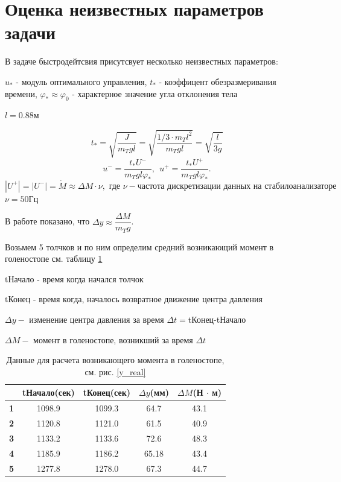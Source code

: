 \documentclass[a4paper,12pt, openany]{book}
\theoremstyle{plain} %
\theoremstyle{definition} %
\theoremstyle{remark} %
\numberwithin{equation}{chapter}
\begin{document}
{\section{Оценка неизвестных параметров задачи}

В задаче быстродейтсвия присутсвует несколько неизвестных параметров:

$u_*$ - модуль оптимального управления,
$t_*$ - коэффицент обезразмеривания времени,
$\varphi_*\approx\varphi_0$ - характерное значение угла отклонения тела


$l=0.88$м

$$t_\ast=\sqrt{\frac{J}{m_Tgl}}=\sqrt{\frac{1/3 \cdot m_T l^2}{m_Tgl}}=\sqrt{\frac{l}{3g}}$$
\[
    u^-=\frac{t_\ast U^-}{m_Tgl\varphi_\ast },\ \ u^+=\frac{t_\ast U^+}{m_Tgl\varphi_\ast}.
\]
$|U^+|=|U^-|=\dot M\approx \Delta M \cdot \nu, \text{ где } \nu - \text{частота дискретизации данных на стабилоанализаторе } $
$\nu =50\text{Гц}$

В работе \cite{kruchinMetoda} показано, что $\Delta y\approx\dfrac{\Delta M}{m_Tg}$.

Возьмем 5 толчков и по ним определим средний возникающий момент в голеностопе см. таблицу \ref*{moments_calculating}

tНачало - время когда начался толчок

tКонец - время когда, началось возвратное движение центра давления

$\Delta y - $ изменение центра давления за время $\Delta t = $tКонец-tНачало

$\Delta M - $ момент в голеностопе, возникший за время $\Delta t$
\begin{table}[h!]
    \centering
    \begin{tabular}{|l|c|c|c|c|}
        \hline
        \textbf{}                                    &
        \multicolumn{1}{l|}{\textbf{tНачало(сек)}}    &
        \multicolumn{1}{l|}{\textbf{tКонец(сек)}}      &
        \multicolumn{1}{l|}{\textbf{$\Delta y$(мм)}} &
        \multicolumn{1}{l|}{\textbf{$\Delta M $(Н $\cdot$ м)}}                        \\ \hline
        \textbf{1}                                   & 1098.9 & 1099.3 & 64.7  & 43.1 \\ \hline
        \textbf{2}                                   & 1120.8 & 1121.0 & 61.5  & 40.9 \\ \hline
        \textbf{3}                                   & 1133.2 & 1133.6 & 72.6  & 48.3 \\ \hline
        \textbf{4}                                   & 1185.9 & 1186.2 & 65.18 & 43.4 \\ \hline
        \textbf{5}                                   & 1277.8 & 1278.0 & 67.3  & 44.7 \\ \hline
    \end{tabular}
    \caption{Данные для расчета возникающего момента в голеностопе, см. рис. \ref{y_real} }
    \label{moments_calculating}
\end{table}

}
\end{document}
